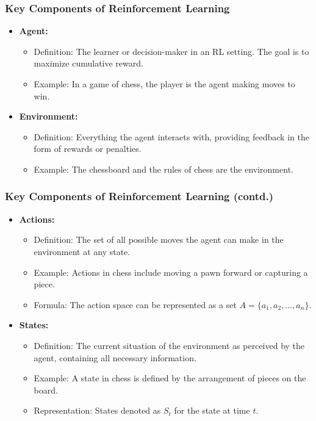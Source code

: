 \documentclass[aspectratio=169]{beamer}
\begin{document}
\begin{frame}[fragile]
    \frametitle{Key Components of Reinforcement Learning}
    \begin{itemize}
        \item \textbf{Agent:} 
            \begin{itemize}
                \item Definition: The learner or decision-maker in an RL setting. The goal is to maximize cumulative reward.
                \item Example: In a game of chess, the player is the agent making moves to win.
            \end{itemize}
        \item \textbf{Environment:} 
            \begin{itemize}
                \item Definition: Everything the agent interacts with, providing feedback in the form of rewards or penalties.
                \item Example: The chessboard and the rules of chess are the environment.
            \end{itemize}
    \end{itemize}
\end{frame}

\begin{frame}[fragile]
    \frametitle{Key Components of Reinforcement Learning (contd.)}
    \begin{itemize}
        \item \textbf{Actions:} 
            \begin{itemize}
                \item Definition: The set of all possible moves the agent can make in the environment at any state.
                \item Example: Actions in chess include moving a pawn forward or capturing a piece.
                \item Formula: The action space can be represented as a set \( A = \{a_1, a_2, \ldots, a_n\} \).
            \end{itemize}
        \item \textbf{States:} 
            \begin{itemize}
                \item Definition: The current situation of the environment as perceived by the agent, containing all necessary information.
                \item Example: A state in chess is defined by the arrangement of pieces on the board.
                \item Representation: States denoted as \( S_t \) for the state at time \( t \).
            \end{itemize}
    \end{itemize}
\end{frame}
\end{document}
